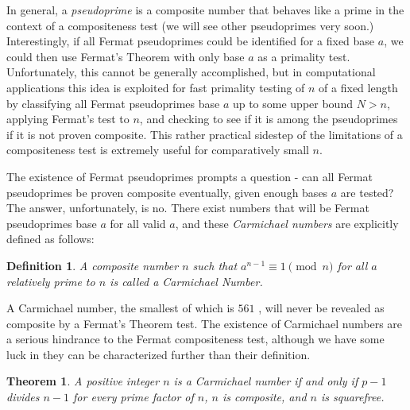 \documentclass{article}
\newtheorem*{theorem}{Theorem}
\newtheorem*{definition}{Definition}
\begin{document}
 \par In general, a \textit{pseudoprime} is a composite number that behaves like a prime in the context of a compositeness test (we will see other pseudoprimes very soon.) Interestingly, if all Fermat pseudoprimes could be identified for a fixed base $a$, we could then use Fermat's Theorem with only base $a$ as a primality test. Unfortunately, this cannot be generally accomplished, but in computational applications this idea is exploited for fast primality testing of $n$ of a fixed length by classifying all Fermat pseudoprimes base $a$ up to some upper bound $N > n$, applying Fermat's test to $n$, and checking to see if it is among the pseudoprimes if it is not proven composite. This rather practical sidestep of the limitations of a compositeness test is extremely useful for comparatively small $n$.
 
 \par The existence of Fermat pseudoprimes prompts a question - can all Fermat pseudoprimes be proven composite eventually, given enough bases $a$ are tested? The answer, unfortunately, is no. There exist numbers that will be Fermat pseudoprimes base $a$ for all valid $a$, and these\textit{ Carmichael numbers} are explicitly defined as follows:
 
 \begin{definition}
  A composite number $n$ such that $a^{n -1} \equiv 1 \pmod n$ for all $a$ relatively prime to $n$ is called a \textit{Carmichael Number}.
 \end{definition}
 
 A Carmichael number, the smallest of which is $561$ \citep{riesel}, will never be revealed as composite by a Fermat's Theorem test. The existence of Carmichael numbers are a serious hindrance to the Fermat compositeness test, although we have some luck in they can be characterized further than their definition.

\begin{theorem} A positive integer $n$ is a Carmichael number if and only if $p-1$ divides $n-1$ for every prime factor of $n$, $n$ is composite, and $n$ is squarefree.
\end{theorem}
\end{document}
